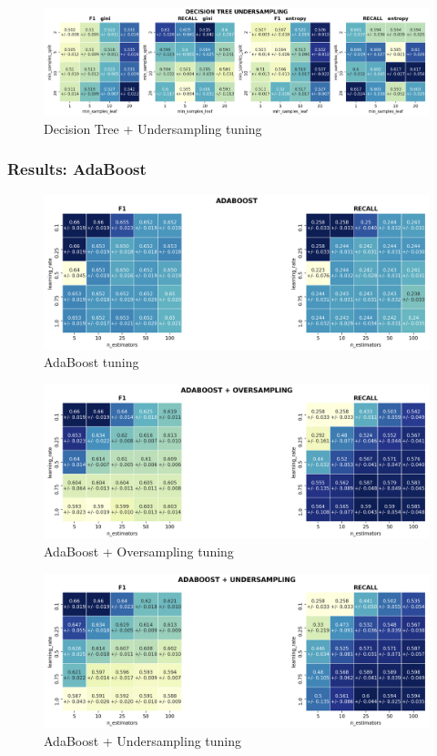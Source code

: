 \documentclass{article}
\begin{document}
	\begin{figure}[H]
		\centering
		\includegraphics[width=.9\textwidth]{clf_img/DecisionTree_US.png}
		\caption{Decision Tree + Undersampling tuning}
		\label{fig:hyper_dectreeUS}
	\end{figure}
	
	
	\subsubsection{Results: AdaBoost}
	\begin{figure}[H]
		\centering
		\includegraphics[width=.8\textwidth]{clf_img/Adaboost.png}
		\caption{AdaBoost tuning}
		\label{fig:hyper_ada}
	\end{figure}
	
	\begin{figure}[H]
		\centering
		\includegraphics[width=.8\textwidth]{clf_img/Adaboost_OS.png}
		\caption{AdaBoost + Oversampling tuning}
		\label{fig:hyper_adaOS}
	\end{figure}
	
	\begin{figure}[H]
		\centering
		\includegraphics[width=.8\textwidth]{clf_img/Adaboost_US.png}
		\caption{AdaBoost + Undersampling tuning}
		\label{fig:hyper_adaUS}
	\end{figure}
	
\end{document}
